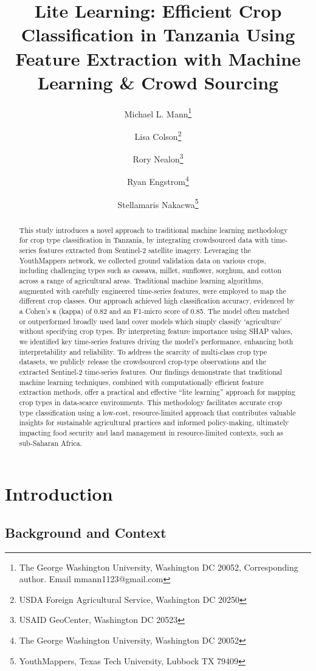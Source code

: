 \documentclass[
  journal,
  twocolumn]{IEEEtran}
\title{Lite Learning: Efficient Crop Classification in Tanzania Using
Feature Extraction with Machine Learning \& Crowd Sourcing}
\author{
Michael L. Mann\thanks{The George Washington University, Washington DC
20052, Corresponding author. Email mmann1123@gmail.com} \and 
Lisa Colson\thanks{USDA Foreign Agricultural Service, Washington DC
20250} \and 
Rory Nealon\thanks{USAID GeoCenter, Washington DC 20523} \and 
Ryan Engstrom\thanks{The George Washington University, Washington DC
20052} \and 
Stellamaris Nakacwa\thanks{YouthMappers, Texas Tech University, Lubbock
TX 79409}}
\date{}
\begin{document}
\maketitle
\begin{abstract}
This study introduces a novel approach to traditional machine learning
methodology for crop type classification in Tanzania, by integrating
crowdsourced data with time-series features extracted from Sentinel-2
satellite imagery. Leveraging the YouthMappers network, we collected
ground validation data on various crops, including challenging types
such as cassava, millet, sunflower, sorghum, and cotton across a range
of agricultural areas. Traditional machine learning algorithms,
augmented with carefully engineered time-series features, were employed
to map the different crop classes. Our approach achieved high
classification accuracy, evidenced by a Cohen's κ (kappa) of 0.82 and an
F1-micro score of 0.85. The model often matched or outperformed broadly
used land cover models which simply classify `agriculture' without
specifying crop types. By interpreting feature importance using SHAP
values, we identified key time-series features driving the model's
performance, enhancing both interpretability and reliability. To address
the scarcity of multi-class crop type datasets, we publicly release the
crowdsourced crop-type observations and the extracted Sentinel-2
time-series features. Our findings demonstrate that traditional machine
learning techniques, combined with computationally efficient feature
extraction methods, offer a practical and effective ``lite learning''
approach for mapping crop types in data-scarce environments. This
methodology facilitates accurate crop type classification using a
low-cost, resource-limited approach that contributes valuable insights
for sustainable agricultural practices and informed policy-making,
ultimately impacting food security and land management in
resource-limited contexts, such as sub-Saharan Africa.
\end{abstract}

\hypertarget{introduction}{%
\section{Introduction}\label{introduction}}

\hypertarget{background-and-context}{%
\subsection{Background and Context}\label{background-and-context}}
\end{document}
